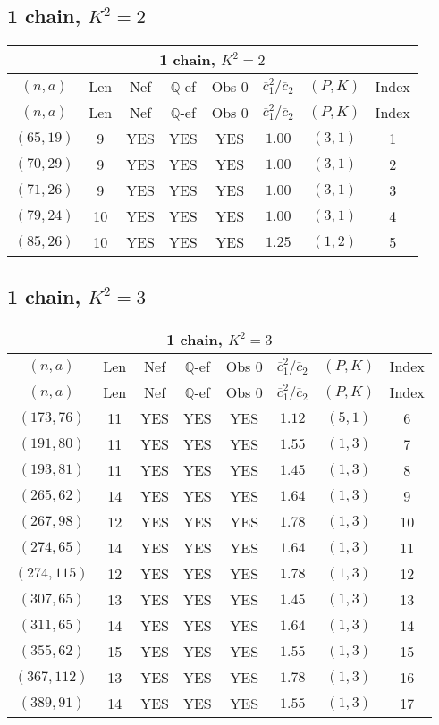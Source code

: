 \subsection{1 chain, $K^2 = 2$}
\begin{longtable}{|c|c|c|c|c|c|c|c|}
\hline
\multicolumn{8}{|c|}{1 chain, $K^2 = 2$}\\
\hline
$(n,a)$ & Len & Nef & $\mathbb Q$-ef & Obs 0 & $\overline c_1^2 / \overline c_2$ & $(P,K)$ & Index\\
\hline
\endfirsthead

\hline
$(n,a)$ & Len & Nef & $\mathbb Q$-ef & Obs 0 & $\overline c_1^2 / \overline c_2$ & $(P,K)$ & Index\\
\hline
\endhead
\hline
\endfoot

$(65,19)$ & 9 & YES & YES & YES & $1.00$ & $(3,1)$ & 1\\
$(70,29)$ & 9 & YES & YES & YES & $1.00$ & $(3,1)$ & 2\\
$(71,26)$ & 9 & YES & YES & YES & $1.00$ & $(3,1)$ & 3\\
$(79,24)$ & 10 & YES & YES & YES & $1.00$ & $(3,1)$ & 4\\
$(85,26)$ & 10 & YES & YES & YES & $1.25$ & $(1,2)$ & 5
\end{longtable}
\subsection{1 chain, $K^2 = 3$}
\begin{longtable}{|c|c|c|c|c|c|c|c|}
\hline
\multicolumn{8}{|c|}{1 chain, $K^2 = 3$}\\
\hline
$(n,a)$ & Len & Nef & $\mathbb Q$-ef & Obs 0 & $\overline c_1^2 / \overline c_2$ & $(P,K)$ & Index\\
\hline
\endfirsthead

\hline
$(n,a)$ & Len & Nef & $\mathbb Q$-ef & Obs 0 & $\overline c_1^2 / \overline c_2$ & $(P,K)$ & Index\\
\hline
\endhead
\hline
\endfoot

$(173,76)$ & 11 & YES & YES & YES & $1.12$ & $(5,1)$ & 6\\
$(191,80)$ & 11 & YES & YES & YES & $1.55$ & $(1,3)$ & 7\\
$(193,81)$ & 11 & YES & YES & YES & $1.45$ & $(1,3)$ & 8\\
$(265,62)$ & 14 & YES & YES & YES & $1.64$ & $(1,3)$ & 9\\
$(267,98)$ & 12 & YES & YES & YES & $1.78$ & $(1,3)$ & 10\\
$(274,65)$ & 14 & YES & YES & YES & $1.64$ & $(1,3)$ & 11\\
$(274,115)$ & 12 & YES & YES & YES & $1.78$ & $(1,3)$ & 12\\
$(307,65)$ & 13 & YES & YES & YES & $1.45$ & $(1,3)$ & 13\\
$(311,65)$ & 14 & YES & YES & YES & $1.64$ & $(1,3)$ & 14\\
$(355,62)$ & 15 & YES & YES & YES & $1.55$ & $(1,3)$ & 15\\
$(367,112)$ & 13 & YES & YES & YES & $1.78$ & $(1,3)$ & 16\\
$(389,91)$ & 14 & YES & YES & YES & $1.55$ & $(1,3)$ & 17
\end{longtable}
